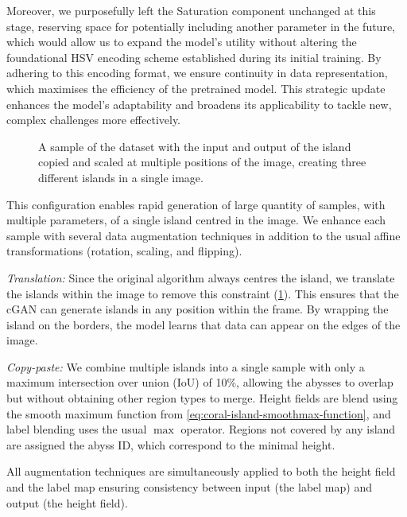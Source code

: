 Moreover, we purposefully left the Saturation component unchanged at this stage, reserving space for potentially including another parameter in the future, which would allow us to expand the model's utility without altering the foundational HSV encoding scheme established during its initial training. By adhering to this encoding format, we ensure continuity in data representation, which maximises the efficiency of the pretrained model. This strategic update enhances the model's adaptability and broadens its applicability to tackle new, complex challenges more effectively.

\begin{figure}[tb]
    \caption[A sample of the dataset with multiple transformations]{A sample of the dataset with the input and output of the island copied and scaled at multiple positions of the image, creating three different islands in a single image.}
    \label{fig:coral-island-cGAN-examples}
\end{figure}

This configuration enables rapid generation of large quantity of samples, with multiple parameters, of a single island centred in the image. We enhance each sample with several data augmentation techniques in addition to the usual affine transformations (rotation, scaling, and flipping).

\textit{Translation:} Since the original algorithm always centres the island, we translate the islands within the image to remove this constraint (\cref{fig:coral-island-cGAN-examples}). This ensures that the cGAN can generate islands in any position within the frame. By wrapping the island on the borders, the model learns that data can appear on the edges of the image.

\textit{Copy-paste:} We combine multiple islands into a single sample with only a maximum intersection over union (IoU) of 10\%, allowing the abysses to overlap but without obtaining other region types to merge. Height fields are blend using the smooth maximum function from \cref{eq:coral-island-smoothmax-function}, and label blending uses the usual $\max$ operator. Regions not covered by any island are assigned the abyss ID, which correspond to the minimal height.

All augmentation techniques are simultaneously applied to both the height field and the label map ensuring consistency between input (the label map) and output (the height field). 


